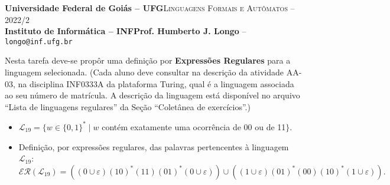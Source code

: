 \documentclass[12pt]{article}
\def\discente{João Lucas Rodrigues Soares}
\def\matricula{202003580}
\def\ua{03}
\def\myling{{19}} %
\begin{document}
 \begin{tcolorbox}[rounded corners, colback=blue!3, colframe=blue!40!black]
  \footnotesize\textbf{Universidade Federal de Goiás -- UFG}\hfill \textsc{Linguagens Formais e Autômatos -- 2022/2}\\
  \footnotesize\textbf{Instituto de Informática -- INF\hfill Prof. Humberto J. Longo} -- \scriptsize\texttt{longo@inf.ufg.br}
 \end{tcolorbox}\bigskip
%
\begin{tcolorbox}[rounded corners, colback=blue!2, colframe=blue!40!black, title=\textbf{Atividade AA-\ua}]
   Nesta tarefa deve-se propôr uma definição por \textbf{Expressões Regulares} para a linguagem selecionada. (Cada aluno deve consultar na descrição da atividade AA-\ua, na disciplina INF0333A da plataforma Turing, qual é a linguagem associada ao seu número de matrícula. A descrição da linguagem está disponível no arquivo ``Lista de linguagens regulares'' da Seção ``Coletânea de exercícios''.)
\end{tcolorbox}\bigskip
%
\begin{tcolorbox}[rounded corners, colback=yellow!5, colframe=red!40!black, title=\textbf{\matricula\ -- \discente}]
 \begin{itemize}[leftmargin=*]
% 
  \item $\mathcal{L}_\myling = \{w\in\{0,1\}^*\mid w$ contém exatamente uma ocorrência de 00 ou de 11$ \}$.
%
  \item Definição, por expressões regulares, das palavras pertencentes à linguagem $\mathcal{L}_\myling$:
   $$\mathcal{ER}(\mathcal{L}_\myling) =
    ((0\cup \varepsilon)(10)^*(11)(01)^*(0\cup \varepsilon))\cup((1\cup \varepsilon)(01)^*(00)(10)^*(1\cup \varepsilon))
   .$$
 \end{itemize}
\end{tcolorbox}
%
\end{document}
